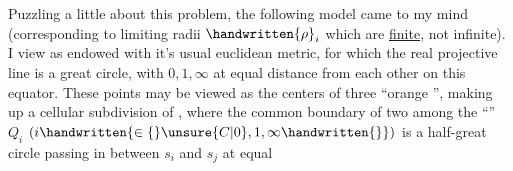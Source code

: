 Puzzling a little about this problem, the following model came to my mind (corresponding to limiting radii $\handwritten{\rho}_i$ which are \uline{finite}, not infinite). I view \handwritten{$\Sigma$} as endowed with it's usual euclidean metric, for which the real projective line is a great circle, with $0,1,\infty$ at equal distance from each other on this equator. These points may be viewed as the centers of three ``orange '', making up a cellular subdivision of \handwritten{$\Sigma$}, where the common boundary of two among the ``'' $Q_i$ $(i\handwritten{\in\{}\unsure{C|0},1,\infty\handwritten{\}})$ is a half-great circle passing in between $s_i$ and $s_j$ at equal
